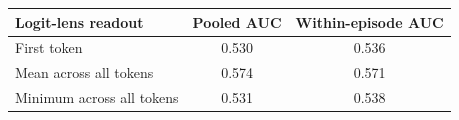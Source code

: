 \begin{tabular}{lcc}
\toprule
Logit-lens readout & Pooled AUC & Within-episode AUC \\
\midrule
First token & 0.530 & 0.536 \\
Mean across all tokens & 0.574 & 0.571 \\
Minimum across all tokens & 0.531 & 0.538 \\
\bottomrule
\end{tabular}
